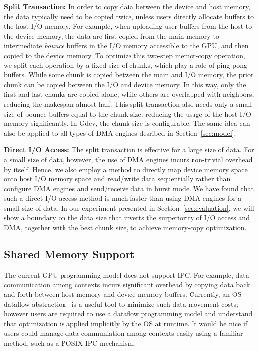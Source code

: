 \textbf{Split Transaction:}
In order to copy data between the device and host memory, the data
typically need to be copied twice, unless users directly allocate
buffers to the host I/O memory. 
For example, when uploading user buffers from the host to the device
memory, the data are first copied from the main memory to intermediate
\textit{bounce} buffers in the I/O memory accessible to the GPU, and
then copied to the device memory.
To optimize this two-step memor-copy operation, we split each operation
by a fixed size of chunks, which play a role of ping-pong buffers.
While some chunk is copied between the main and I/O memory, the prior
chunk can be copied between the I/O and device memory.
In this way, only the first and last chunks are copied alone, while
others are overlapped with neighbors, reducing the makespan almost half.
This split transaction also needs only a small size of bounce buffers
equal to the chunk size, reducing the usage of the host I/O memory
significantly.
In Gdev, the chunk size is configurable.
The same idea can also be applied to all types of DMA engines desribed in
Section~\ref{sec:model}.

\textbf{Direct I/O Access:}
The split transaction is effective for a large size of data.
For a small size of data, however, the use of DMA engines incurs
non-trivial overhead by itself.
Hence, we also employ a method to directly map device memory space onto
host I/O memory space and read/write data sequentially rather than
configure DMA engines and send/receive data in burst mode.
We have found that such a direct I/O access method is much faster than
using DMA engines for a small size of data.
In our experiment presented in Section~\ref{sec:evaluation}, we will
show a boundary on the data size that inverts the surperiority of I/O
access and DMA, together with the best chunk size, to achieve
memory-copy optimization.

\subsection{Shared Memory Support}
\label{sec:shared_memory}

The current GPU programming model does not support IPC.
For example, data communication among contexts incurs significant
overhead by copying data back and forth between host-memory and
device-memory buffers.
Currently, an OS dataflow abstraction~\cite{Rossbach_SOSP11} is a useful
tool to minimize such data movement costs; however users are required to
use a dataflow programming model and understand that optimization is
applied implicitly by the OS at runtime.
It would be nice if users could manage data communiation among contexts
easily using a familiar method, such as a POSIX IPC mechanism.


